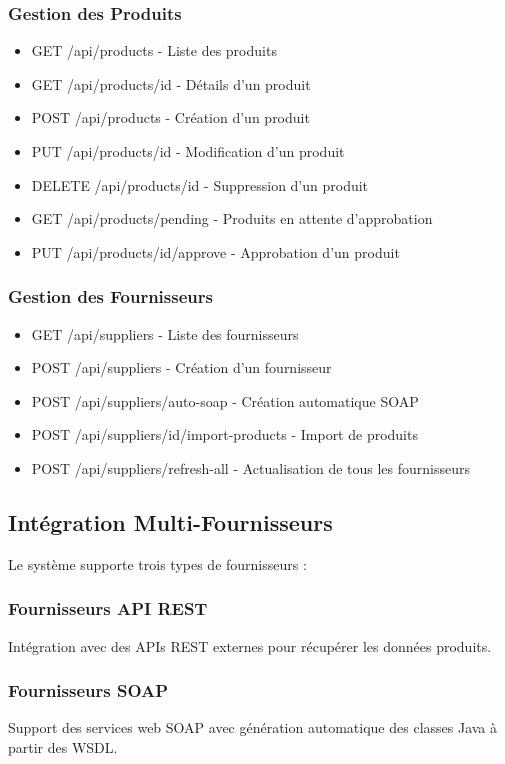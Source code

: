 \documentclass[12pt,a4paper]{report}
\begin{document}
\subsubsection{Gestion des Produits}
\begin{itemize}
    \item GET /api/products - Liste des produits
    \item GET /api/products/{id} - Détails d'un produit
    \item POST /api/products - Création d'un produit
    \item PUT /api/products/{id} - Modification d'un produit
    \item DELETE /api/products/{id} - Suppression d'un produit
    \item GET /api/products/pending - Produits en attente d'approbation
    \item PUT /api/products/{id}/approve - Approbation d'un produit
\end{itemize}

\subsubsection{Gestion des Fournisseurs}
\begin{itemize}
    \item GET /api/suppliers - Liste des fournisseurs
    \item POST /api/suppliers - Création d'un fournisseur
    \item POST /api/suppliers/auto-soap - Création automatique SOAP
    \item POST /api/suppliers/{id}/import-products - Import de produits
    \item POST /api/suppliers/refresh-all - Actualisation de tous les fournisseurs
\end{itemize}

\subsection{Intégration Multi-Fournisseurs}

Le système supporte trois types de fournisseurs :

\subsubsection{Fournisseurs API REST}
Intégration avec des APIs REST externes pour récupérer les données produits.

\subsubsection{Fournisseurs SOAP}
Support des services web SOAP avec génération automatique des classes Java à partir des WSDL.
\end{document}
